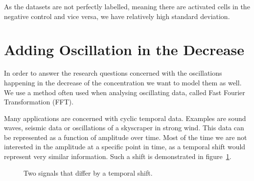 As the datasets are not perfectly labelled, meaning there are activated cells in the negative control and vice versa, we have relatively high standard deviation.

\section{Adding Oscillation in the Decrease}

In order to answer the research questions concerned with the oscillations happening in the decrease of the \Calcium concentration we want to model them as well. We use a method often used when analysing oscillating data, called Fast Fourier Transformation (FFT).

Many applications are concerned with cyclic temporal data. Examples are sound waves, seismic data or oscillations of a skyscraper in strong wind. This data can be represented as a function of amplitude over time. Most of the time we are not interested in the amplitude at a specific point in time, as a temporal shift would represent very similar information. Such a shift is demonstrated in figure~\ref{fig:tempoal_shift}.

\begin{figure}
	\centering
	
	\begin{subfigure}[b]{\textwidth}
	\end{subfigure}
	
	\caption{Two signals that differ by a temporal shift.}
	\label{fig:tempoal_shift}
\end{figure}

